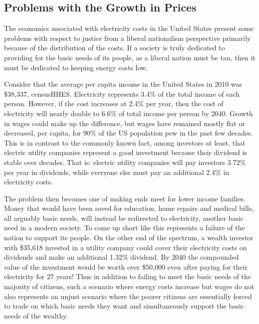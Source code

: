 \subsection{Problems with the Growth in Prices}

The economics associated with electricity costs in the United States present 
some problems with respect to justice from a liberal nationalism perspective 
primarily because of the distribution of the costs. If a society is truly 
dedicated to providing for the basic needs of its people, as a liberal nation 
must be \cite{jay}{tan}, then it must be dedicated to keeping energy costs low.

Consider that the average per capita income in the United States in 2010 was
\$38,337, \cite{jay}{censusHHES}. Electricity represents 3.4\% of the total income 
of each person. However, if the cost increases at 2.4\% per year, then the cost 
of electricity will nearly double to 6.6\% of total income per person by 2040.
Growth in wages could make up the difference, but wages have remained mostly 
flat or decreased, per capita, for 90\% of the US population \cite{jay}{pew} in the 
past few decades. This is in contrast to the commonly known fact, among investors 
at least, that electric utility companies represent a good investment because 
their dividend is stable over decades. That is: electric utility companies will 
pay investors 3.72\% per year in dividends, while everyone else must pay an 
additional 2.4\% in electricity costs.

The problem then becomes one of making ends meet for lower income families. 
Money that would have been saved for education, home repairs and medical bills, 
all arguably basic needs, will instead be redirected to electricity, another
basic  need in a modern society. To come up short like this represents a failure
of the nation to support its people. On the other end of the spectrum, a wealth 
investor with \$35,618 invested in a utility company could cover their
electricity  costs on dividends and make an additional 1.32\% dividend. By 2040 
the compounded value of the investment would be worth over \$50,000 even after 
paying for their electricity for 27 years! Thus in addition to failing to meet 
the basic needs of the majority of citizens, such a scenario where energy costs 
increase but wages do not also represents an unjust scenario where the poorer 
citizens are essentially forced to trade on which basic needs they want and 
simultaneously support the basic needs of the wealthy.

